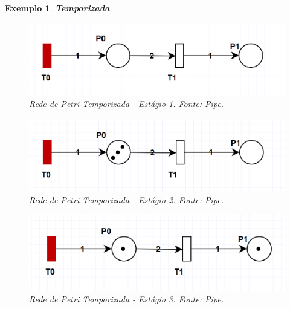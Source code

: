 \documentclass[
	12pt,				%
	openright,			%
	oneside,			%
	a4paper,			%
	english,			%
	brazil				%
	]{abntex2}
\newtheorem{exemplo}{Exemplo}
\begin{document}
\begin{exemplo} \textbf{Temporizada}
\label{exemplo_temporarizada}

\begin{figure}[ht] 
	\centering
	\includegraphics[scale=0.55]{figuras/exemplo_rede_petri_temporizada_1.png}
	\caption[Rede de Petri Temporizada - Estágio 1]{Rede de Petri Temporizada - Estágio 1. Fonte: Pipe.}
	\label{fig:rede_petri_temporizada_ex_01}
\end{figure}

\begin{figure}[ht] 
	\centering
	\includegraphics[scale=0.55]{figuras/exemplo_rede_petri_temporizada_2.png}
	\caption[Rede de Petri Temporizada - Estágio 2]{Rede de Petri Temporizada - Estágio 2. Fonte: Pipe.}
	\label{fig:rede_petri_temporizada_ex_02}
\end{figure}

\begin{figure}[ht] 
	\centering
	\includegraphics[scale=0.55]{figuras/exemplo_rede_petri_temporizada_3.png}
	\caption[Rede de Petri Temporizada - Estágio 3]{Rede de Petri Temporizada - Estágio 3. Fonte: Pipe.}
	\label{fig:rede_petri_temporizada_ex_03}
\end{figure}

\end{exemplo}
\end{document}
